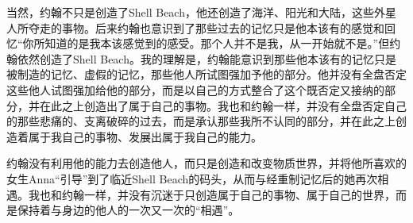 当然，约翰不只是创造了Shell Beach，他还创造了海洋、阳光和大陆，这些外星人所夺走的事物。后来约翰也意识到了那些过去的记忆只是他本该有的感觉和回忆\pozhehao{}“你所知道的是我本该感觉到的感受。那个人并不是我，从一开始就不是。”但约翰依然创造了Shell Beach。我的理解是，约翰能意识到那些他本该有的记忆只是被制造的记忆、虚假的记忆，那些他人所试图强加予他的部分。他并没有全盘否定这些他人试图强加给他的部分，而是以自己的方式整合了这个既否定又接纳的部分，并在此之上创造出了属于自己的事物。我也和约翰一样，并没有全盘否定自己的那些悲痛的、支离破碎的过去，而是承认那些我所不认同的部分，并在此之上创造着属于我自己的事物、发展出属于我自己的能力。

约翰没有利用他的能力去创造他人，而只是创造和改变物质世界，并将他所喜欢的女生Anna“引导”到了临近Shell Beach的码头，从而与经重制记忆后的她再次相遇。我也和约翰一样，并没有沉迷于只创造属于自己的事物、属于自己的世界，而是保持着与身边的他人的一次又一次的“相遇”。

